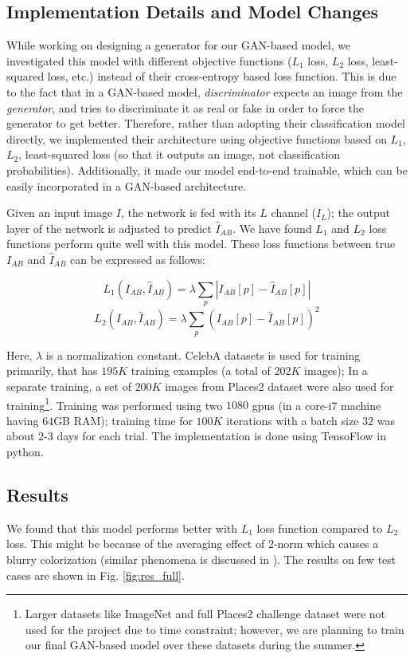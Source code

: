 \documentclass{article} %
\begin{document}
\subsection{\textbf{Implementation Details and Model Changes}}
While working on designing a generator for our GAN-based model, we investigated this model with different objective functions ($L_1$ loss, $L_2$ loss, least-squared loss, etc.) instead of their cross-entropy based loss function. This is due to the fact that in a GAN-based model, \textit{discriminator} expects an image from the \textit{generator}, 
and tries to discriminate it as real or fake in order to force the generator to get better.  
Therefore, rather than adopting their classification model directly, we implemented their architecture 
using objective functions based on $L_1$, $L_2$, least-squared loss (so that it outputs an image, not classification probabilities). Additionally, it made our model end-to-end trainable, which can be easily incorporated in a GAN-based architecture. 

Given an input image $I$, the network is fed with its $L$ channel ($I_L$); the output layer of the network is adjusted to predict $\hat{I}_{AB}$. We have found $L_1$ and $L_2$ loss functions perform quite well with this model. These loss functions between true $I_{AB}$ and $\hat{I}_{AB}$ can be expressed as follows:

\[ L_1 (I_{AB}, \hat{I}_{AB}) = \lambda \sum_p | I_{AB}[p] - \hat{I}_{AB}[p] | \]  
\[ L_2 (I_{AB}, \hat{I}_{AB}) = \lambda \sum_p ( I_{AB}[p] - \hat{I}_{AB}[p] )^2 \]  

Here, $\lambda$ is a normalization constant. CelebA datasets \cite{celebA} is used for training primarily, that has $195K$ training examples (a total of  $202K$ images); 
In a separate training, a set of $200K$ images from Places2 dataset \cite{places2} were also used for training\footnote{Larger datasets like ImageNet \cite{deng2009imagenet} and full Places2 challenge dataset were not used for the project due to time constraint; however, we are planning to train our final GAN-based model over these datasets during the summer.}. Training was performed using two $1080$ gpus (in a core-i7 machine having $64$GB RAM); training time for $100K$ iterations with a batch size $32$ was about $2$-$3$ days for each trial. The implementation is done using TensoFlow \cite{abadi2016tensorflow} in python.    

\subsection{\textbf{Results}}
We found that this model performs better with $L_1$ loss function compared to $L_2$ loss. This might be because of the averaging effect of $2$-norm which causes a blurry colorization (similar phenomena is discussed in \cite{zhang2016colorful}). The results on few test cases are shown in Fig. \ref{fig:res_full}. 
\end{document}
